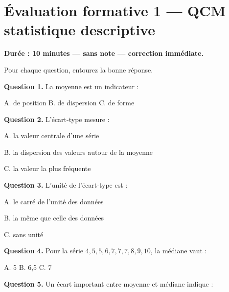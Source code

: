 \documentclass[11pt,a4paper]{article}
\begin{document}
\newpage

\section*{Évaluation formative 1 — QCM statistique descriptive}

\begin{evaluation}
\textbf{Durée : 10 minutes — sans note — correction immédiate.}

\vspace{0.3cm}
Pour chaque question, entourez la bonne réponse.

\vspace{0.4cm}
\textbf{Question 1.} La moyenne est un indicateur :

\hspace{1cm} A. de position \hspace{2.5cm} B. de dispersion \hspace{2.5cm} C. de forme

\vspace{0.4cm}
\textbf{Question 2.} L'écart-type mesure :

\hspace{1cm} A. la valeur centrale d'une série

\hspace{1cm} B. la dispersion des valeurs autour de la moyenne

\hspace{1cm} C. la valeur la plus fréquente

\vspace{0.4cm}
\textbf{Question 3.} L'unité de l'écart-type est :

\hspace{1cm} A. le carré de l'unité des données

\hspace{1cm} B. la même que celle des données

\hspace{1cm} C. sans unité

\vspace{0.4cm}
\textbf{Question 4.} Pour la série $4, 5, 5, 6, 7, 7, 7, 8, 9, 10$, la médiane vaut :

\hspace{1cm} A. 5 \hspace{2.5cm} B. 6{,}5 \hspace{2.5cm} C. 7

\vspace{0.4cm}
\textbf{Question 5.} Un écart important entre moyenne et médiane indique :


\end{evaluation}
\end{document}
